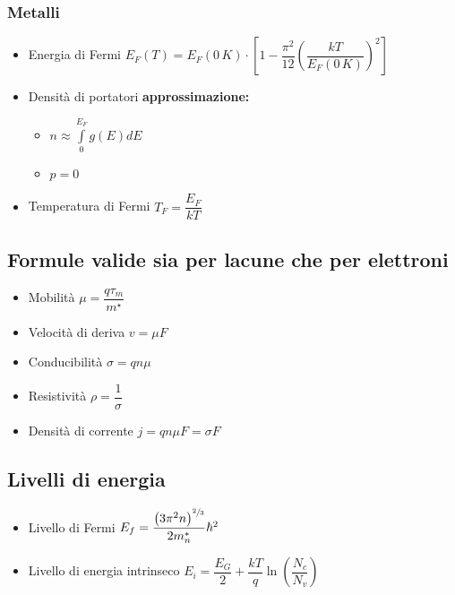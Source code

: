 \documentclass{article}
\begin{document}
\subsubsection{Metalli}
\begin{itemize}
  \item Energia di Fermi \( E_F(T) = E_F(0 \, K) \cdot \left[ 1 - \dfrac{\pi ^ 2}{12} \left( \dfrac{kT}{E_F(0 \, K)}\right) ^ 2\right]\)
  \item Densità di portatori \textbf{approssimazione:}
        \begin{itemize}
          \item \( \displaystyle n \approx \int\limits_{0}^{E_F} g(E) dE \)
          \item \( p = 0 \)
        \end{itemize}
  \item Temperatura di Fermi \( T_{F} = \dfrac{E_F}{k T} \)
\end{itemize}

\newpage

\subsection{Formule valide sia per lacune che per elettroni}
\begin{itemize}
  \item Mobilità \( \mu = \dfrac{q \tau_m}{m^\star} \)
  \item Velocità di deriva \( v = \mu F \)
  \item Conducibilità \( \sigma = q n \mu \)
  \item Resistività \( \rho = \dfrac{1}{\sigma} \)
  \item Densità di corrente \( j = q n \mu F = \sigma F \)
\end{itemize}

\subsection{Livelli di energia}
\begin{itemize}
  \item Livello di Fermi \( E_f = \dfrac{ \left(3 \pi^2 n\right)^{\sfrac{2}{3}} }{2 m_n^*} \hbar ^ 2 \)
  \item Livello di energia intrinseco \( E_i  = \dfrac{E_G}{2} + \dfrac{kT}{q} \ln \left( \dfrac{N_c}{N_v}\right) \)
\end{itemize}
\end{document}
